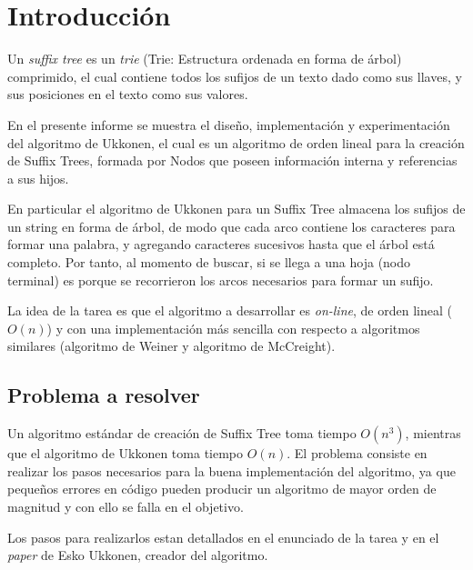 \documentclass[letterpaper,10pt]{article}
\begin{document}
	\tableofcontents

	\newpage

	\section{Introducción}

	Un \textit{suffix tree} es un \textit{trie} (Trie: Estructura ordenada en forma de árbol) comprimido, el cual contiene todos los sufijos de un texto dado como sus llaves, y sus posiciones en el
	texto como sus valores.

	En el presente informe se muestra el diseño, implementación y experimentación del algoritmo de Ukkonen, el cual es un algoritmo de orden lineal para la creación de Suffix Trees,
	formada por Nodos que poseen información interna y referencias a sus hijos.

	En particular el algoritmo de Ukkonen para un Suffix Tree almacena los sufijos de un string en forma de árbol, de modo que cada arco contiene los caracteres para formar una palabra, y
	agregando caracteres sucesivos hasta que el árbol está completo.
	Por tanto, al momento de buscar, si se llega a una hoja (nodo terminal) es porque se recorrieron los arcos necesarios para formar un sufijo.

	La idea de la tarea es que el algoritmo a desarrollar es \textit{on-line}, de orden lineal ($O(n)$) y con una implementación más sencilla con respecto a algoritmos similares (algoritmo de Weiner
	y algoritmo de McCreight).

	\subsection{Problema a resolver}

	Un algoritmo estándar de creación de Suffix Tree toma tiempo $O(n^3)$, mientras que el algoritmo de Ukkonen toma tiempo $O(n)$.
	El problema consiste en realizar los pasos necesarios para la buena implementación del algoritmo, ya que pequeños errores en código pueden producir un algoritmo de mayor orden de magnitud
	y con ello se falla en el objetivo.

	Los pasos para realizarlos estan detallados en el enunciado de la tarea y en el \textit{paper} de Esko Ukkonen, creador del algoritmo.
\end{document}
